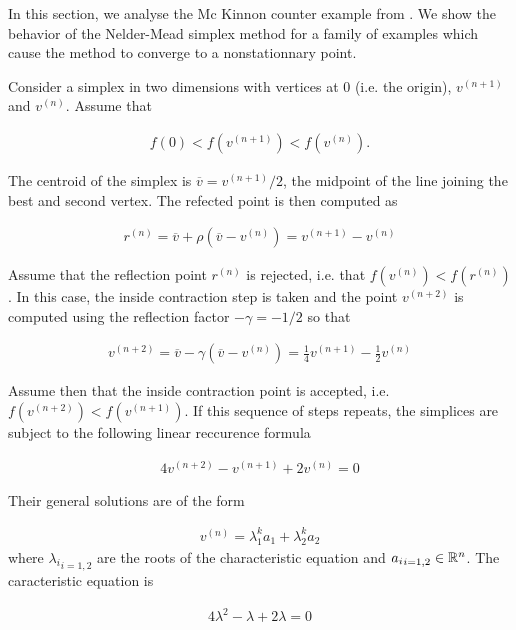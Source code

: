 In this section, we analyse the Mc Kinnon counter example 
from \cite{589109}. We show the behavior of the 
Nelder-Mead simplex method for a family of examples which cause the 
method to converge to a nonstationnary point.

Consider a simplex in two dimensions with vertices at 0 (i.e. the origin),
$v^{(n+1)}$ and $v^{(n)}$. Assume that 

\begin{eqnarray}
\label{mckinnon-sortedfv}
f(0) < f(v^{(n+1)}) < f(v^{(n)}).
\end{eqnarray}

The centroid of the simplex is $\overline{v} = v^{(n+1)}/2$, the midpoint
of the line joining the best and second vertex. The refected 
point is then computed as 

\begin{eqnarray}
\label{mckinnon-reflection}
r^{(n)} = \overline{v} + \rho ( \overline{v} - v^{(n)} ) = v^{(n+1)} - v^{(n)}
\end{eqnarray}

Assume that the reflection point $r^{(n)}$ is rejected, i.e. that 
$f(v^{(n)}) < f(r^{(n)})$. In this case, the inside contraction 
step is taken and the point $v^{(n+2)}$ is computed using the 
reflection factor $-\gamma = -1/2$ so that 

\begin{eqnarray}
\label{mckinnon-insidecontraction}
v^{(n+2)} = \overline{v} - \gamma ( \overline{v} - v^{(n)} ) = \frac{1}{4} v^{(n+1)} - \frac{1}{2} v^{(n)}
\end{eqnarray}

Assume then that the inside contraction point is accepted, i.e. $f(v^{(n+2)}) < f(v^{(n+1)})$.
If this sequence of steps repeats, the simplices are subject to the 
following linear reccurence formula

\begin{eqnarray}
\label{mckinnon-reccurence}
4 v^{(n+2)} - v^{(n+1)} + 2 v^{(n)} = 0
\end{eqnarray}

Their general solutions are of the form 

\begin{eqnarray}
v^{(n)} = \lambda_1^k a_1 + \lambda_2^k a_2
\end{eqnarray}
where ${\lambda_i}_{i=1,2}$ are the roots of the characteristic equation and 
${a_i}_{i=1,2} \in \mathbb{R}^n$. 
The caracteristic equation is 

\begin{eqnarray}
\label{mckinnon-caracequation}
4 \lambda^2 - \lambda + 2 \lambda = 0
\end{eqnarray}

